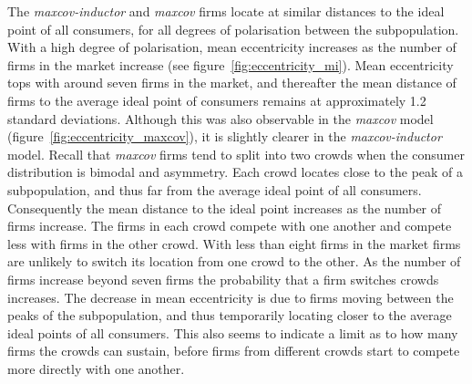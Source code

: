 \documentclass[preprint, 12pt]{elsarticle}
\begin{document}
The \emph{maxcov-inductor} and \emph{maxcov} firms locate at similar distances to the ideal point of all consumers, for all degrees of polarisation between the subpopulation. With a high degree of polarisation, mean eccentricity increases as the number of firms in the market increase (see figure~\ref{fig:eccentricity_mi}). Mean eccentricity tops with around seven firms in the market, and thereafter the mean distance of firms to the average ideal point of consumers remains at approximately 1.2 standard deviations. Although this was also observable in the \emph{maxcov} model (figure~\ref{fig:eccentricity_maxcov}), it is slightly clearer in the \emph{maxcov-inductor} model. Recall that \emph{maxcov} firms tend to split into two crowds when the consumer distribution is bimodal and asymmetry. Each crowd locates close to the peak of a subpopulation, and thus far from the average ideal point of all consumers. Consequently the mean distance to the ideal point increases as the number of firms increase. The firms in each crowd compete with one another and compete less with firms in the other crowd. With less than eight firms in the market firms are unlikely to switch its location from one crowd to the other. As the number of firms increase beyond seven firms the probability that a firm switches crowds increases. The decrease in mean eccentricity is due to firms moving between the peaks of the subpopulation, and thus temporarily locating closer to the average ideal points of all consumers. This also seems to indicate a limit as to how many firms the crowds can sustain, before firms from different crowds start to compete more directly with one another.
\end{document}
